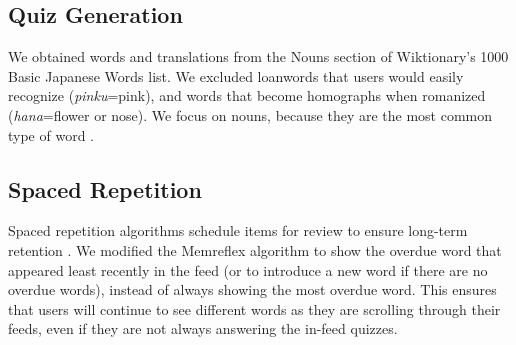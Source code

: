 \documentclass{sigchi}
\begin{document}
 \subsection{Quiz Generation}

We obtained words and translations from the Nouns section of Wiktionary's 1000 Basic Japanese Words list. We excluded loanwords that users would easily recognize (\textit{pinku}=pink), and words that become homographs when romanized (\textit{hana}=flower or nose). We focus on nouns, because they are the most common type of word \cite{microlearning}. %

\pagebreak

\subsection{Spaced Repetition}

Spaced repetition algorithms schedule items for review to ensure long-term retention \cite{karpicke2011spaced}. We modified the Memreflex algorithm \cite{memreflex} to show the overdue word that appeared least recently in the feed (or to introduce a new word if there are no overdue words), instead of always showing the most overdue word. %
This ensures that users will continue to see different words as they are scrolling through their feeds, even if they are not always answering the in-feed quizzes.


\end{document}
